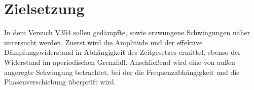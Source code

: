 \section{Zielsetzung}

\begin{flushleft}
    In dem Versuch V354 sollen gedämpfte, sowie erzwungene Schwingungen näher untersucht werden.
    Zuerst wird die Amplitude und der effektive Dämpfungswiderstand in Abhängigkeit des Zeitgesetzes ermittel,
    ebenso der Widerstand im aperiodischen Grenzfall. Anschließend wird eine von außen angeregte Schwingung betrachtet, bei der die Frequenzabhängigkeit und die Phasenverschiebung überprüft wird.
\end{flushleft}